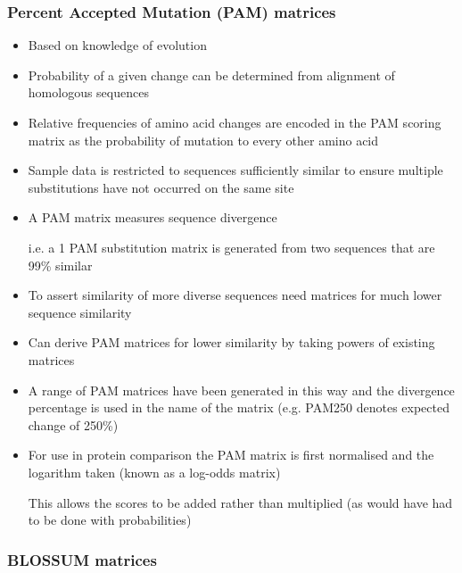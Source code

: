 \documentclass[a4paper]{article}
\begin{document}
\subsubsection{Percent Accepted Mutation (PAM) matrices}

\begin{itemize}
  \item
    Based on knowledge of evolution

  \item
    Probability of a given change can be determined from alignment of homologous
    sequences

  \item
    Relative frequencies of amino acid changes are encoded in the PAM scoring
    matrix as the probability of mutation to every other amino acid

  \item
    Sample data is restricted to sequences sufficiently similar to ensure
    multiple substitutions have not occurred on the same site

  \item
    A PAM matrix measures sequence divergence

    i.e. a 1 PAM substitution matrix is generated from two sequences that are
    99\% similar

  \item
    To assert similarity of more diverse sequences need matrices for much lower
    sequence similarity

  \item
    Can derive PAM matrices for lower similarity by taking powers of existing
    matrices

  \item
    A range of PAM matrices have been generated in this way and the divergence
    percentage is used in the name of the matrix (e.g. PAM250 denotes expected
    change of 250\%)

  \item
    For use in protein comparison the PAM matrix is first normalised and the
    logarithm taken (known as a log-odds matrix)

    This allows the scores to be added rather than multiplied (as would have had
    to be done with probabilities)
\end{itemize}

\subsubsection{BLOSSUM matrices}
\end{document}
